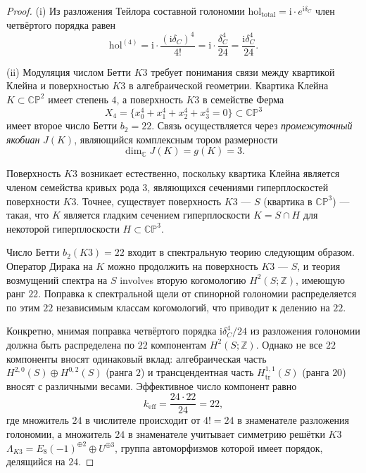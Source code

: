 \documentclass[12pt,a4paper]{article}
\theoremstyle{definition}
\theoremstyle{remark}
\newcommand{\CC}{\mathbb{C}}
\newcommand{\ZZ}{\mathbb{Z}}
\newcommand{\PP}{\mathbb{P}}
\newcommand{\hol}{\mathrm{hol}}
\newcommand{\ii}{\mathrm{i}}
\begin{document}
\begin{proof}
(i) Из разложения Тейлора составной голономии $\hol_{\mathrm{total}} = \ii \cdot e^{\ii\delta_C}$ член четвёртого порядка равен
\begin{equation}
\hol^{(4)} = \ii \cdot \frac{(\ii\delta_C)^4}{4!} = \ii \cdot \frac{\delta_C^4}{24} = \frac{\ii \delta_C^4}{24}.
\end{equation}

(ii) Модуляция числом Бетти $K3$ требует понимания связи между квартикой Клейна и поверхностью $K3$ в алгебраической геометрии. Квартика Клейна $K \subset \CC\PP^2$ имеет степень $4$, а поверхность $K3$ в семействе Ферма
\begin{equation}
X_4 = \{x_0^4 + x_1^4 + x_2^4 + x_3^4 = 0\} \subset \CC\PP^3
\end{equation}
имеет второе число Бетти $b_2 = 22$. Связь осуществляется через \emph{промежуточный якобиан} $J(K)$, являющийся комплексным тором размерности
\begin{equation}
\dim_{\CC} J(K) = g(K) = 3.
\end{equation}

Поверхность $K3$ возникает естественно, поскольку квартика Клейна является членом семейства кривых рода $3$, являющихся сечениями гиперплоскостей поверхности $K3$. Точнее, существует поверхность $K3$ --- $S$ (квартика в $\CC\PP^3$) --- такая, что $K$ является гладким сечением гиперплоскости $K = S \cap H$ для некоторой гиперплоскости $H \subset \CC\PP^3$.

Число Бетти $b_2(K3) = 22$ входит в спектральную теорию следующим образом. Оператор Дирака на $K$ можно продолжить на поверхность $K3$ --- $S$, и теория возмущений спектра на $S$ involves вторую когомологию $H^2(S; \ZZ)$, имеющую ранг $22$. Поправка к спектральной щели от спинорной голономии распределяется по этим $22$ независимым классам когомологий, что приводит к делению на $22$.

Конкретно, мнимая поправка четвёртого порядка $\ii\delta_C^4/24$ из разложения голономии должна быть распределена по $22$ компонентам $H^2(S; \ZZ)$. Однако не все $22$ компоненты вносят одинаковый вклад: алгебраическая часть $H^{2,0}(S) \oplus H^{0,2}(S)$ (ранга $2$) и трансцендентная часть $H^{1,1}_{\mathrm{tr}}(S)$ (ранга $20$) вносят с различными весами. Эффективное число компонент равно
\begin{equation}
k_{\mathrm{eff}} = \frac{24 \cdot 22}{24} = 22,
\end{equation}
где множитель $24$ в числителе происходит от $4! = 24$ в знаменателе разложения голономии, а множитель $24$ в знаменателе учитывает симметрию решётки $K3$ $\Lambda_{K3} = E_8(-1)^{\oplus 2} \oplus U^{\oplus 3}$, группа автоморфизмов которой имеет порядок, делящийся на $24$.


\end{proof}
\end{document}
